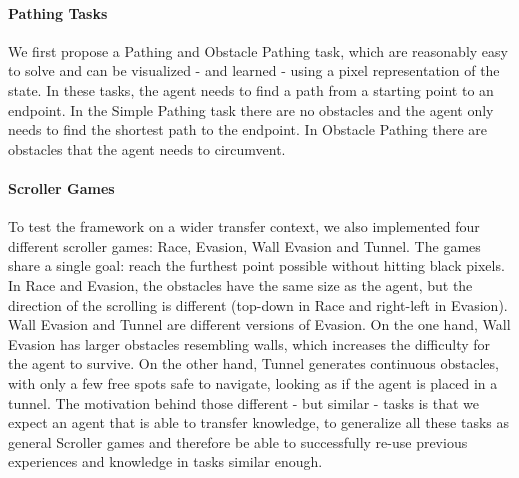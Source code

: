 \paragraph{Pathing Tasks}
We first propose a Pathing and Obstacle Pathing task, which are reasonably easy to solve and can be visualized - and learned - using a pixel representation of the state.
In these tasks, the agent needs to find a path from a starting point to an endpoint. 
In the Simple Pathing task there are no obstacles and the agent only needs to find the shortest path to the endpoint. 
In Obstacle Pathing there are obstacles that the agent needs to circumvent.

\paragraph{Scroller Games}
To test the framework on a wider transfer context, we also implemented four different scroller games:
Race, Evasion, Wall Evasion and Tunnel. The games share a single goal: reach the furthest point possible without hitting black pixels. 
In Race and Evasion, the obstacles have the same size as the agent, but the direction of the scrolling is different (top-down in Race and right-left in Evasion). Wall Evasion and Tunnel are different versions of Evasion. 
On the one hand, Wall Evasion has larger obstacles resembling walls, which increases the difficulty for the agent to survive. 
On the other hand, Tunnel generates continuous obstacles, with only a few free spots safe to navigate, looking as if the agent is placed in a tunnel. 
The motivation behind those different - but similar - tasks is that we expect an agent that is able to transfer knowledge, to generalize all these tasks as general Scroller games and therefore be able to successfully re-use previous experiences and knowledge in tasks similar enough.

